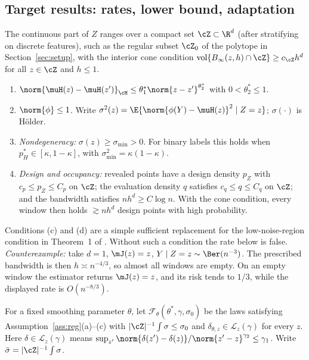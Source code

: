 \subsection{Target results: rates, lower bound, adaptation}

\begin{assumption}[Regularity]
\label{ass:reg}
The continuous part of $Z$ ranges over a compact set $\cZ\subset\R^d$ (after stratifying on discrete
features), such as the regular subset $\cZ_0$ of the polytope in Section~\ref{sec:setup}, with the
interior cone condition
$\mathrm{vol}\{B_\infty(z,h)\cap\cZ\}\ge c_{\cZ}h^d$ for all $z\in\cZ$ and $h\le1$.
\begin{enumerate}[label=(\alph*)]
  \item $\norm{\muH(z)-\muH(z')}_{\cH}\le\theta_1^{*}\norm{z-z'}^{\theta_2^{*}}$ with
        $0<\theta_2^{*}\le1$.
  \item $\norm{\phi}\le1$. Write $\sigma^2(z)=\E\{\norm{\phi(Y)-\muH(z)}^2\mid Z=z\}$; $\sigma(\cdot)$ is
        H\"older.
  \item \emph{Nondegeneracy:} $\sigma(z)\ge\sigma_{\min}>0$. For binary labels this holds when
        $p_H^{*}\in[\kappa,1-\kappa]$, with $\sigma_{\min}^2=\kappa(1-\kappa)$.
  \item \emph{Design and occupancy:} revealed points have a design density $p_Z$ with
        $c_p\le p_Z\le C_p$ on $\cZ$; the evaluation density $q$ satisfies $c_q\le q\le C_q$ on
        $\cZ$; and the bandwidth satisfies $nh^d\ge C\log n$. With the cone condition, every window
        then holds $\gtrsim nh^d$ design points with high probability.
\end{enumerate}
\end{assumption}

Conditions (c) and (d) are a simple sufficient replacement for the low-noise-region condition in
Theorem~1 of \citet{li2026personalizing}. Without such a condition the rate below is false.
\emph{Counterexample:} take $d=1$, $\mJ(z)=z$, $Y\mid Z=z\sim\Ber(n^{-3})$. The prescribed bandwidth is
then $h\asymp n^{-4/3}$, so almost all windows are empty. On an empty window the estimator returns
$\mJ(z)=z$, and its risk tends to $1/3$, while the displayed rate is $O(n^{-8/3})$.

For a fixed smoothing parameter $\theta$, let $\mathcal F_\theta(\theta^{*},\gamma,\sigma_0)$ be the laws
satisfying Assumption~\ref{ass:reg}(a)--(c) with $|\cZ|^{-1}\int\sigma\le\sigma_0$ and
$\delta_{\theta,z}\in\mathcal L_z(\gamma)$ for every $z$. Here $\delta\in\mathcal L_z(\gamma)$ means
$\sup_{z'}\norm{\delta(z')-\delta(z)}/\norm{z'-z}^{\gamma_2}\le\gamma_1$. Write
$\bar\sigma=|\cZ|^{-1}\int\sigma$.

